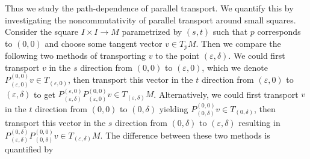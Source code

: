 \documentclass[
]{article}
\begin{document}
Thus we study the path-dependence of parallel transport. We quantify
this by investigating the noncommutativity of parallel transport around
small squares. Consider the square \(I \times I \to M\) parametrized by
\((s,t)\) such that \(p\) corresponds to \((0,0)\) and choose some
tangent vector \(v \in T_p M\). Then we compare the following two
methods of transporting \(v\) to the point \((\varepsilon, \delta)\). We
could first transport \(v\) in the \(s\) direction from \((0,0)\) to
\((\varepsilon, 0)\), which we denote
\(P^{(0,0)}_{(\varepsilon,0)}v \in T_{(\varepsilon,0)}\), then transport
this vector in the \(t\) direction from \((\varepsilon, 0)\) to
\((\varepsilon, \delta)\) to get
\(P_{(\varepsilon,\delta)}^{(\varepsilon,0)}P^{(0,0)}_{(\varepsilon,0)}v \in T_{(\varepsilon,\delta)}M\).
Alternatively, we could first transport \(v\) in the \(t\) direction
from \((0,0)\) to \((0, \delta)\) yielding
\(P^{(0,0)}_{(0,\delta)}v \in T_{(0,\delta)}\), then transport this
vector in the \(s\) direction from \((0, \delta)\) to
\((\varepsilon, \delta)\) resulting in
\(P_{(\varepsilon,\delta)}^{(0,\delta)}P^{(0,0)}_{(0,\delta)}v \in T_{(\varepsilon,\delta)}M\).
The difference between these two methods is quantified by
\end{document}

